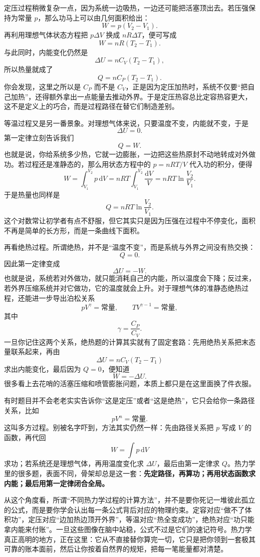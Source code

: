 \documentclass[UTF8]{ctexbook}
\begin{document}
定压过程稍微复杂一点，因为系统一边吸热，一边还可能把活塞顶出去。若压强保持为常量 \(p\)，那么功马上可以由几何面积给出：
\[
W=p(V_2-V_1).
\]
再利用理想气体状态方程把 \(p\Delta V\) 换成 \(nR\Delta T\)，便可写成
\[
W=nR(T_2-T_1).
\]
与此同时，内能变化仍然是
\[
\Delta U=nC_V(T_2-T_1),
\]
所以热量就成了
\[
Q=nC_P(T_2-T_1).
\]
你会发现，这里之所以是 \(C_P\) 而不是 \(C_V\)，正是因为定压加热时，系统不仅要“把自己加热”，还得额外拿出一点能量去推动外界。于是定压热容总比定容热容更大，这不是定义上的巧合，而是过程路径在替它们制造差别。

等温过程又是另一番景象。对理想气体来说，只要温度不变，内能就不变，于是
\[
\Delta U=0.
\]
第一定律立刻告诉我们
\[
Q=W.
\]
也就是说，你给系统多少热，它就一边膨胀，一边把这些热原封不动地转成对外做功。若过程还是准静态的，那么用状态方程中的 \(p=nRT/V\) 代入功的积分，便得
\[
W=\int_{V_1}^{V_2}p\,\mathrm dV
=nRT\int_{V_1}^{V_2}\frac{\mathrm dV}{V}
=nRT\ln\frac{V_2}{V_1}.
\]
于是热量也同样是
\[
Q=nRT\ln\frac{V_2}{V_1}.
\]
这个对数常让初学者有点不舒服，但它其实只是因为压强在过程中不停变化，面积不再是简单的长方形，而是一条曲线下面积。

再看绝热过程。所谓绝热，并不是“温度不变”，而是系统与外界之间没有热交换：
\[
Q=0.
\]
因此第一定律变成
\[
\Delta U=-W.
\]
也就是说，系统若对外做功，就只能消耗自己的内能，所以温度会下降；反过来，若外界压缩系统并对它做功，它的温度就会上升。对于理想气体的准静态绝热过程，还能进一步导出泊松关系
\[
pV^{\gamma}=\text{常量},
\qquad
TV^{\gamma-1}=\text{常量},
\]
其中
\[
\gamma=\frac{C_P}{C_V}.
\]
一旦你记住这两个关系，绝热题的计算其实就有了固定套路：先用绝热关系把末态量联系起来，再由
\[
\Delta U=nC_V(T_2-T_1)
\]
求出内能变化，最后因为 \(Q=0\)，便知道
\[
W=-\Delta U.
\]
很多看上去花哨的活塞压缩和喷管膨胀问题，本质上都只是在这里面换了件衣服。

有时题目并不会老老实实告诉你“这是定压”或者“这是绝热”，它只会给你一条路径关系，比如
\[
pV^n=\text{常量}.
\]
这叫多方过程。别被名字吓到，方法其实仍然一样：先由路径关系把 \(p\) 写成 \(V\) 的函数，再代回
\[
W=\int p\,\mathrm dV
\]
求功；若系统还是理想气体，再用温度变化求 \(\Delta U\)，最后由第一定律求 \(Q\)。热力学里的很多题，表面不同，骨架却总是这一套：\textbf{先定路径，再算功；再用状态函数求内能；最后用第一定律闭合全局。}

从这个角度看，所谓“不同热力学过程的计算方法”，并不是要你死记一堆彼此孤立的公式，而是要你学会认出每一条公式背后对应的物理约束。定容对应“做不了体积功”，定压对应“边加热边顶开外界”，等温对应“热全变成功”，绝热对应“功只能拿内能来付账”。一旦这些图像在脑中站稳，公式不过是它们的速记符号。热力学真正高明的地方，正在这里：它从不直接替你算完一切，它只是把你领到一套极其可靠的账本面前，然后让你按着自然界的规矩，把每一笔能量都对清楚。
\end{document}
